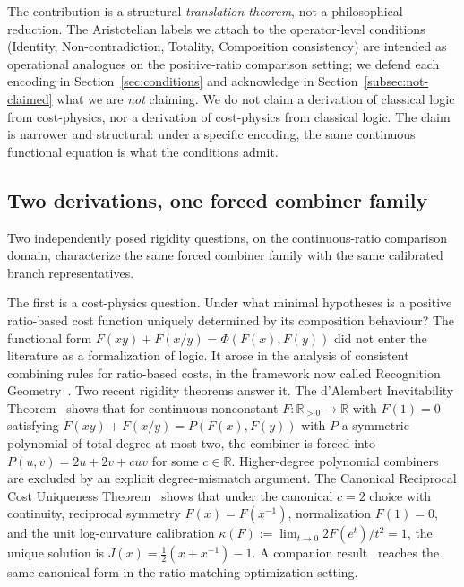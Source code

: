 \documentclass[11pt,a4paper]{article}
\theoremstyle{definition}
\theoremstyle{remark}
\begin{document}
The contribution is a structural \emph{translation theorem}, not a
philosophical reduction. The Aristotelian labels we attach to the
operator-level conditions (Identity, Non-contradiction, Totality,
Composition consistency) are intended as operational analogues on the
positive-ratio comparison setting; we defend each encoding in
Section~\ref{sec:conditions} and acknowledge in
Section~\ref{subsec:not-claimed} what we are \emph{not} claiming. We do
not claim a derivation of classical logic from cost-physics, nor a
derivation of cost-physics from classical logic. The claim is narrower
and structural: under a specific encoding, the same continuous functional
equation is what the conditions admit.

\subsection{Two derivations, one forced combiner family}

Two independently posed rigidity questions, on the continuous-ratio
comparison domain, characterize the same forced combiner family with
the same calibrated branch representatives.

The first is a cost-physics question. Under what minimal hypotheses is
a positive ratio-based cost function uniquely determined by its
composition behaviour? The functional form $F(xy) + F(x/y) = \Phi(F(x),
F(y))$ did not enter the literature as a formalization of logic. It
arose in the analysis of consistent combining rules for ratio-based
costs, in the framework now called Recognition
Geometry~\cite{PardoGuerraThapaWashburnAllahyarov2026,
WashburnZlatanovicAllahyarov2026, WashburnZlatanovic2026}. Two recent
rigidity theorems answer it. The d'Alembert Inevitability
Theorem~\cite{WashburnZlatanovicAllahyarov2026} shows that for
continuous nonconstant $F : \mathbb{R}_{>0} \to \mathbb{R}$ with
$F(1) = 0$ satisfying $F(xy) + F(x/y) = P(F(x), F(y))$ with $P$ a
symmetric polynomial of total degree at most two, the combiner is
forced into $P(u, v) = 2u + 2v + cuv$ for some $c \in \mathbb{R}$.
Higher-degree polynomial combiners are excluded by an explicit
degree-mismatch argument. The Canonical Reciprocal Cost Uniqueness
Theorem~\cite{WashburnZlatanovic2026} shows that under the canonical
$c = 2$ choice with continuity, reciprocal symmetry $F(x) = F(x^{-1})$,
normalization $F(1) = 0$, and the unit log-curvature calibration
$\kappa(F) := \lim_{t \to 0} 2F(e^t)/t^2 = 1$, the unique solution is
$J(x) = \tfrac{1}{2}(x + x^{-1}) - 1$. A companion
result~\cite{WashburnRahnamai2026} reaches the same canonical form in
the ratio-matching optimization setting.
\end{document}
